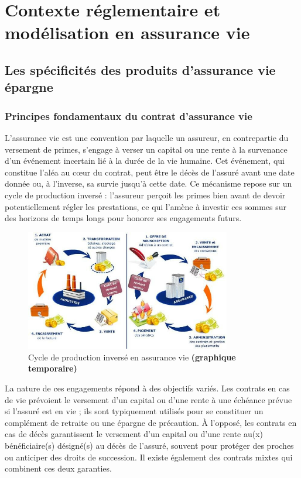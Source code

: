 \chapter{Contexte réglementaire et modélisation en assurance vie}
\label{chap:contexte}
\newpage
\section{Les spécificités des produits d'assurance vie épargne}
\label{sec:spec_av}

\subsection{Principes fondamentaux du contrat d'assurance vie}

L'assurance vie est une convention par laquelle un assureur, en contrepartie du versement de primes, s'engage à verser un capital ou une rente à la survenance d'un événement incertain lié à la durée de la vie humaine. Cet événement, qui constitue l'aléa au cœur du contrat, peut être le décès de l'assuré avant une date donnée ou, à l'inverse, sa survie jusqu'à cette date. Ce mécanisme repose sur un cycle de production inversé : l'assureur perçoit les primes bien avant de devoir potentiellement régler les prestations, ce qui l'amène à investir ces sommes sur des horizons de temps longs pour honorer ses engagements futurs.

\begin{figure}[H]
    \centering
    \includegraphics[width=0.8\textwidth]{images/2_chapitres/chapitre1/cycle-de-production.jpg}
    \caption{Cycle de production inversé en assurance vie \textbf{(graphique temporaire)}}
    \label{fig:cycle_production_inverse}
\end{figure}

La nature de ces engagements répond à des objectifs variés. Les contrats en cas de vie prévoient le versement d'un capital ou d'une rente à une échéance prévue si l'assuré est en vie ; ils sont typiquement utilisés pour se constituer un complément de retraite ou une épargne de précaution. À l'opposé, les contrats en cas de décès garantissent le versement d'un capital ou d'une rente au(x) bénéficiaire(s) désigné(s) au décès de l'assuré, souvent pour protéger des proches ou anticiper des droits de succession. Il existe également des contrats mixtes qui combinent ces deux garanties.


